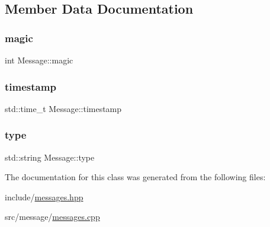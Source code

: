 \subsection{Member Data Documentation}
\mbox{\label{classMessage_a5bb4366b0a888886fec19ca2b2903d00}} 
\subsubsection{\texorpdfstring{magic}{magic}}
{\footnotesize\ttfamily int Message\+::magic\hspace{0.3cm}{\ttfamily [protected]}}

\mbox{\label{classMessage_a78b882ca696ae5b4387b829132ff21ab}} 
\subsubsection{\texorpdfstring{timestamp}{timestamp}}
{\footnotesize\ttfamily std\+::time\+\_\+t Message\+::timestamp\hspace{0.3cm}{\ttfamily [protected]}}

\mbox{\label{classMessage_ae9dead264183a4243c120026e6259b6f}} 
\subsubsection{\texorpdfstring{type}{type}}
{\footnotesize\ttfamily std\+::string Message\+::type\hspace{0.3cm}{\ttfamily [protected]}}



The documentation for this class was generated from the following files\+:\begin{DoxyCompactItemize}
\item 
include/\mbox{\hyperlink{messages_8hpp}{messages.\+hpp}}\item 
src/message/\mbox{\hyperlink{messages_8cpp}{messages.\+cpp}}\end{DoxyCompactItemize}
